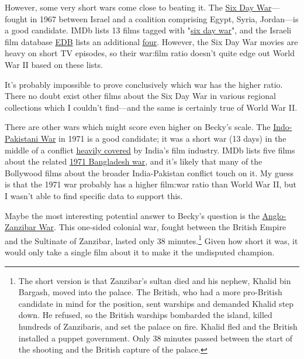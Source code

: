 {{However, some very short wars come close to beating it. The \href{http://en.wikipedia.org/wiki/Six-Day\_War}{Six Day War}—fought in 1967 between Israel and a coalition comprising Egypt, Syria, Jordan—is a good candidate. IMDb lists 13 films tagged with "\href{http://www.imdb.com/keyword/six-day-war/}{six day war}", and the Israeli film database \href{http://www.edb.co.il/}{EDB} lists an additional \href{http://www.edb.co.il/browse/tag/127/} {four}. However, the Six Day War movies are heavy on short TV episodes, so their war:film ratio doesn't quite edge out World War II based on these lists.}

{It's probably impossible to prove conclusively which war has the higher ratio. There no doubt exist other films about the Six Day War in various regional collections which I couldn't find—and the same is certainly true of World War II.}

{There are other wars which might score even higher on Becky's scale. The \href{http://en.wikipedia.org/wiki/Indo-Pakistani\_War\_of\_1971}{Indo-Pakistani War} in 1971 is a good candidate; it was a short war (13 days) in the middle of a conflict \href{http://timesofindia.indiatimes.com/videols/7824538.cms}{heavily covered} by India's film industry. IMDb lists five films about the related \href{http://en.wikipedia.org/wiki/Bangladesh\_Liberation\_War} {1971 Bangladesh war}, and it's likely that many of the Bollywood films about the broader India-Pakistan conflict touch on it. My guess is that the 1971 war probably has a higher film:war ratio than World War II, but I wasn't able to find specific data to support this.}

{Maybe the most interesting potential answer to Becky's question is the \href{http://en.wikipedia.org/wiki/Anglo-Zanzibar\_War}{Anglo-Zanzibar War}. This one-sided colonial war, fought between the British Empire and the Sultinate of Zanzibar, lasted only 38 minutes.{\footnote{The short version is that Zanzibar's sultan died and his nephew, Khalid bin Bargash, moved into the palace. The British, who had a more pro-British candidate in mind for the position, sent warships and demanded Khalid step down. He refused, so the British warships bombarded the island, killed hundreds of Zanzibaris, and set the palace on fire. Khalid fled and the British installed a puppet government. Only 38 minutes passed between the start of the shooting and the British capture of the palace.} } Given how short it was, it would only take a single film about it to make it the undisputed champion.}

}
